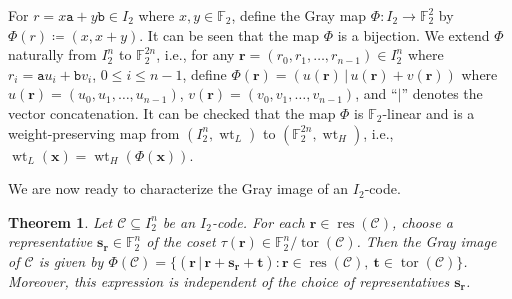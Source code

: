 \documentclass[12pt]{article}
\newtheorem{theorem}{Theorem}[section]
\theoremstyle{definition}
\theoremstyle{plain}
\newcommand{\Blue}[1]{{ \color{blue} #1}}
\begin{document}
For $r = x \mathtt{a} + y \mathtt{b} \in  I_2$ where $x , y \in \mathbb{F}_2$, define the Gray map $\Phi \colon I_2 \to \mathbb{F}_2^2$ by $\Phi ( r  )  \coloneqq ( x , x + y )$. It can be seen that the map $\Phi$ is a bijection. We extend $\Phi$ naturally from $I_2^n$ to $\mathbb{F}_2^{2n}$, i.e., for any $\mathbf{r} = (r_0 , r_1 , \dotsc , r_{n-1}) \in I_2^n$ where $r_i =  \mathtt{a}  u_i +  \mathtt{b}  v_i$, $0 \leq i \leq n-1$, define $\Phi (\mathbf{r}) = (u (\mathbf{r}) \, | \, u (\mathbf{r}) + v (\mathbf{r}))$ where $u (\mathbf{r}) = (u_0 , u_1 , \dotsc , u_{n-1})$, $v (\mathbf{r}) = (v_0 , v_1 , \dotsc , v_{n-1})$, and ``$|$'' denotes the vector concatenation. It can be checked that the map $\Phi$ is $\mathbb{F}_2$-linear and is a weight-preserving map from $(I_2^n, \operatorname{wt}_L)$ to $(\mathbb{F}_2^{2n},  \operatorname{wt}_H)$, i.e., $\operatorname{wt}_L ( \mathbf{x}  )  =  \operatorname{wt}_H  ( \Phi ( \mathbf{x} )  )$.


We are now ready to characterize the Gray image of an $I_2$-code.

\begin{theorem}   \label{thm:GrayImageGeneral}
Let $\mathcal{C} \subseteq I_2^n$ be an $I_2$-code. For each
$\mathbf{r} \in \operatorname{res}(\mathcal{C})$, choose a representative
$\mathbf{s}_{\mathbf{r}} \in \mathbb{F}_2^n$ of the coset
$\tau (\mathbf{r}) \in \mathbb{F}_2^n / \operatorname{tor}(\mathcal{C})$. Then the Gray image of
$\mathcal{C}$ is given by
$
\Phi(\mathcal{C})
=
\{
(\mathbf{r} \, | \,  \mathbf{r} + \mathbf{s}_{\mathbf{r}} + \mathbf{t})
\mathrel{:}
\mathbf{r} \in \operatorname{res}(\mathcal{C}), \
\mathbf{t} \in \operatorname{tor}(\mathcal{C})
\}
$.
Moreover, this expression is independent of the choice of representatives $\mathbf{s}_{\mathbf{r}}$.
\end{theorem}
\end{document}
